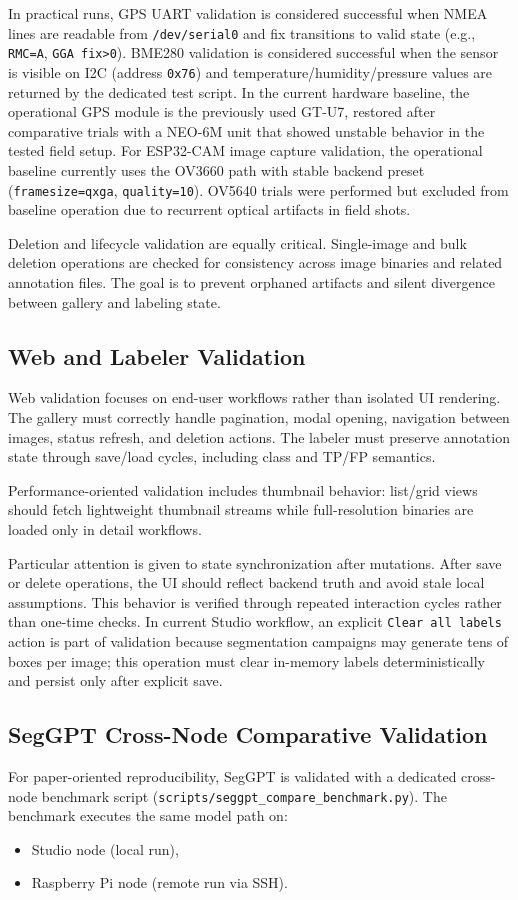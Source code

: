 In practical runs, GPS UART validation is considered successful when NMEA lines are readable from \texttt{/dev/serial0} and fix transitions to valid state (e.g., \texttt{RMC=A}, \texttt{GGA fix>0}). BME280 validation is considered successful when the sensor is visible on I2C (address \texttt{0x76}) and temperature/humidity/pressure values are returned by the dedicated test script.
In the current hardware baseline, the operational GPS module is the previously used GT-U7, restored after comparative trials with a NEO-6M unit that showed unstable behavior in the tested field setup.
For ESP32-CAM image capture validation, the operational baseline currently uses the OV3660 path with stable backend preset (\texttt{framesize=qxga}, \texttt{quality=10}). OV5640 trials were performed but excluded from baseline operation due to recurrent optical artifacts in field shots.

Deletion and lifecycle validation are equally critical. Single-image and bulk deletion operations are checked for consistency across image binaries and related annotation files. The goal is to prevent orphaned artifacts and silent divergence between gallery and labeling state.

\subsection{Web and Labeler Validation}
Web validation focuses on end-user workflows rather than isolated UI rendering. The gallery must correctly handle pagination, modal opening, navigation between images, status refresh, and deletion actions. The labeler must preserve annotation state through save/load cycles, including class and TP/FP semantics.

Performance-oriented validation includes thumbnail behavior: list/grid views should fetch lightweight thumbnail streams while full-resolution binaries are loaded only in detail workflows.

Particular attention is given to state synchronization after mutations. After save or delete operations, the UI should reflect backend truth and avoid stale local assumptions. This behavior is verified through repeated interaction cycles rather than one-time checks.
In current Studio workflow, an explicit \texttt{Clear all labels} action is part of validation because segmentation campaigns may generate tens of boxes per image; this operation must clear in-memory labels deterministically and persist only after explicit save.

\subsection{SegGPT Cross-Node Comparative Validation}
For paper-oriented reproducibility, SegGPT is validated with a dedicated cross-node benchmark script (\texttt{scripts/seggpt\_compare\_benchmark.py}). The benchmark executes the same model path on:
\begin{itemize}
  \item Studio node (local run),
  \item Raspberry Pi node (remote run via SSH).
\end{itemize}


